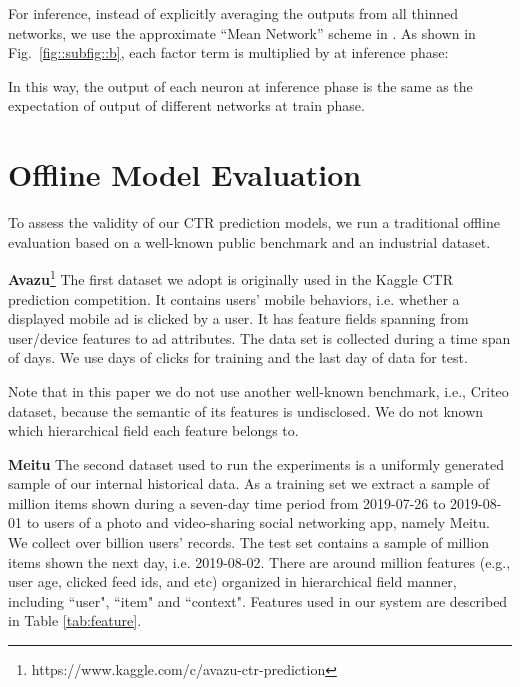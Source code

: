 \documentclass[sigconf]{acmart}
\begin{document}
For inference, instead of explicitly averaging the outputs from all  thinned networks, we use the approximate ``Mean Network'' scheme in \citep{srivastava2014dropout}. As shown in Fig.~\ref{fig::subfig::b}, 
each factor term  is multiplied by  at inference phase:


In this way, the output of each neuron at inference phase is the same as the expectation of output of  different networks at train phase.


\section{Offline Model Evaluation}

To assess the validity of our CTR prediction models, we run a traditional offline evaluation based on a well-known public benchmark and an industrial dataset.

\textbf{Avazu}\footnote{https://www.kaggle.com/c/avazu-ctr-prediction} The first dataset we adopt is originally used in the Kaggle CTR prediction competition. It contains users' mobile behaviors, i.e. whether a displayed mobile ad is clicked by a user. It has  feature fields spanning from user/device features to ad attributes. The data set is collected during a time span of  days. We use  days of clicks for training and the last  day of data for test.

Note that in this paper we do not use another well-known benchmark, i.e., Criteo dataset, because the semantic of its features is undisclosed. We do not known which hierarchical field each feature belongs to.

\textbf{Meitu} The second dataset  used to run the experiments is a uniformly generated sample of our internal historical data. As a training set we extract a sample of  million items shown during a seven-day time period from 2019-07-26 to 2019-08-01 to users of a photo and video-sharing social networking app, namely Meitu.  We collect over  billion users' records. The test set contains a sample of  million items shown the next day, i.e. 2019-08-02. There are around  million features (e.g., user age, clicked feed ids,  and etc) organized in hierarchical field manner, including ``user", ``item" and ``context".  Features used in our system are described in Table \ref{tab:feature}.
\end{document}

